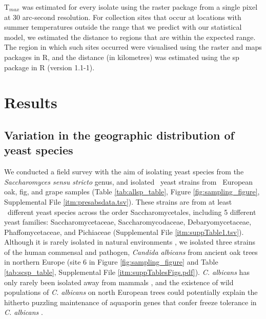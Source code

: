 \documentclass[12pt]{article}
\begin{document}
\begin{linenumbers}
T$_{max}$ was estimated for every isolate using the raster package from a single pixel at 30 arc-second resolution. For collection sites that occur at locations with summer temperatures outside the range that we predict with our statistical model, we estimated the distance to regions that are within the expected range. The region in which such sites occurred were visualised using the raster and maps packages in R, and the distance (in kilometres) was estimated using the sp package in R (version 1.1-1).

\clearpage


\section*{Results}
\label{Results}

\subsection*{Variation in the geographic distribution of yeast species}

We conducted a field survey with the aim of isolating yeast species from the \textit{Saccharomyces sensu stricto} genus, and isolated \yeast\ yeast strains from \samplecount\ European oak, fig, and grape samples (Table \ref{tab:allsp_table}, Figure \ref{fig:sampling_figure}, Supplemental File \ref{itm:presabsdata.tsv}). These strains are from at least \speciescount\ different yeast species across the order Saccharomycetales, including 5 different yeast families: Saccharomycetaceae, Saccharomycodaceae, Debaryomycetaceae, Phaffomycetaceae, and Pichiaceae (Supplemental File \ref{itm:suppTable1.tsv}). Although it is rarely isolated in natural environments \citep{tanghe_aquaporin_2005,lachance_chapter_2011-5,maganti_ecological_2011}, we isolated three strains of the human commensal and pathogen, \textit{Candida albicans} from ancient oak trees in northern Europe (site 6 in Figure \ref{fig:sampling_figure} and Table \ref{tab:scsp_table}, Supplemental File \ref{itm:suppTablesFigs.pdf}). \textit{C. albicans} has only rarely been isolated away from mammals \citep{tanghe_aquaporin_2005,lachance_chapter_2011-5,maganti_ecological_2011}, and the existence of wild populations of \textit{C. albicans} on north European trees could potentially explain the hitherto puzzling maintenance of aquaporin genes that confer freeze tolerance in \textit{C. albicans} \citep{tanghe_aquaporin_2005}.


\end{linenumbers}
\end{document}
